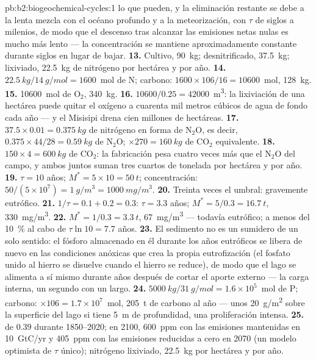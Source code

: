 \begin{solution}{pb:b2:biogeochemical-cycles:1}
lo que pueden, y la eliminación restante se debe a la lenta mezcla con el
océano profundo y a la meteorización, con $\tau$ de siglos a milenios, de
modo que el descenso tras alcanzar las emisiones netas nulas es mucho más
lento --- la concentración se mantiene aproximadamente constante durante
siglos en lugar de bajar.
\textbf{13.} Cultivo, \qty{90}{kg}; desnitrificado, \qty{37.5}{kg};
lixiviado, \qty{22.5}{kg} de nitrógeno por hectárea y por año.
\textbf{14.} $\qty{22.5}{kg}/\qty{14}{g/mol} = 1600$~mol de N; carbono:
$1600\times 106/16 = \num{10600}$~mol, \qty{128}{kg}.
\textbf{15.} \num{10600}~mol de $\mathrm{O_2}$, \qty{340}{kg}.
\textbf{16.} $\num{10600}/0.25 = \num{42000}$~\unit{m^3}: la lixiviación
de una hectárea puede quitar el oxígeno a cuarenta mil metros cúbicos de
agua de fondo cada año --- y el Misisipi drena cien millones de hectáreas.
\textbf{17.} $37.5\times 0.01 = \qty{0.375}{kg}$ de nitrógeno en forma de
$\mathrm{N_2O}$, es decir, $0.375\times 44/28 = \qty{0.59}{kg}$ de $\mathrm{N_2O}$;
$\times 270 = \qty{160}{kg}$ de $\mathrm{CO_2}$ equivalente.
\textbf{18.} $150\times 4 = \qty{600}{kg}$ de $\mathrm{CO_2}$: la fabricación
pesa cuatro veces más que el $\mathrm{N_2O}$ del campo, y ambos juntos suman
tres cuartos de tonelada por hectárea y por año.
\textbf{19.} $\tau = 10$ años; $M^{*} = 5\times 10 = \qty{50}{t}$;
concentración: $50/(5\times 10^{7}) = \qty{1}{g/m^3} =
\qty{1000}{mg/m^3}$.
\textbf{20.} Treinta veces el umbral: gravemente eutrófico.
\textbf{21.} $1/\tau = 0.1 + 0.2 = 0.3$: $\tau = 3.3$ años; $M^{*} =
5/0.3 = \qty{16.7}{t}$, \qty{330}{mg/m^3}.
\textbf{22.} $M^{*} = 1/0.3 = \qty{3.3}{t}$, \qty{67}{mg/m^3} --- todavía
eutrófico; a menos del \qty{10}{\%} al cabo de $\tau\ln 10 = 7.7$ años.
\textbf{23.} El sedimento no es un sumidero de un solo sentido: el fósforo
almacenado en él durante los años eutróficos se libera de nuevo en las
condiciones anóxicas que crea la propia eutrofización (el fosfato unido al
hierro se disuelve cuando el hierro se reduce), de modo que el lago se
alimenta a sí mismo durante años después de cortar el aporte externo ---
la carga interna, un segundo  con un  largo.
\textbf{24.} $\qty{5000}{kg}/\qty{31}{g/mol} = 1.6\times 10^{5}$~mol de P;
carbono: $\times 106 = 1.7\times 10^{7}$~mol, \qty{205}{t} de carbono al
año --- unos \qty{20}{g/m^2} sobre la superficie del lago si tiene
\qty{5}{m} de profundidad, una proliferación intensa.
\textbf{25.}  de $0.39$ durante 1850--2020; en 2100,
\qty{600}{ppm} con las emisiones mantenidas en \qty{10}{GtC/yr} y
\qty{405}{ppm} con las emisiones reducidas a cero en 2070 (un modelo
optimista de $\tau$ único); nitrógeno lixiviado, \qty{22.5}{kg} por
hectárea y por año.
\end{solution}

